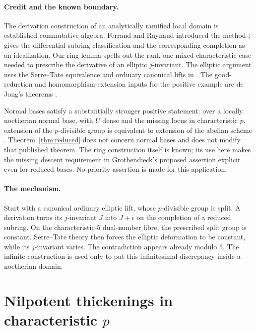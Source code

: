 \documentclass[11pt]{article}
\theoremstyle{remark}\newtheorem{remark}[theorem]{Remark}
\begin{document}
\paragraph{Credit and the known boundary.}
The derivation construction of an analytically ramified local domain is established commutative algebra. Ferrand and Raynaud introduced the method \citep[Lemma~2.1, pp.~300--303]{FerrandRaynaud}; \citet[Theorems~4.1 and~4.4, preprint pp.~11--13]{OlberdingBad} gives the differential-subring classification and the corresponding completion as an idealization. Our ring lemma spells out the rank-one mixed-characteristic case needed to prescribe the derivative of an elliptic $j$-invariant. The elliptic argument uses the Serre--Tate equivalence and ordinary canonical lifts in \citet[Theorem~1.2.1, pp.~143--145; Theorem~2.1, pp.~148--152]{Katz}. The good-reduction and homomorphism-extension inputs for the positive example are de Jong's theorems \citep[Theorems~2--3, p.~261]{DeJongICM}.

Normal bases satisfy a substantially stronger positive statement: over a locally noetherian normal base, with $U$ dense and the missing locus in characteristic $p$, extension of the $p$-divisible group is equivalent to extension of the abelian scheme \citep[Corollary~6.12]{KrishnamoorthyPal}. Theorem~\ref{thm:reduced} does not concern normal bases and does not modify that published theorem. The ring construction itself is known; its use here makes the missing descent requirement in Grothendieck's proposed assertion explicit even for reduced bases. No priority assertion is made for this application.

\paragraph{The mechanism.}
Start with a canonical ordinary elliptic lift, whose $p$-divisible group is split. A derivation turns its $j$-invariant $J$ into $J+\epsilon$ on the completion of a reduced subring. On the characteristic-$5$ dual-number fibre, the prescribed split group is constant. Serre--Tate theory then forces the elliptic deformation to be constant, while its $j$-invariant varies. The contradiction appears already modulo $5$. The infinite construction is used only to put this infinitesimal discrepancy inside a noetherian domain.

\section{Nilpotent thickenings in characteristic \texorpdfstring{$p$}{p}}
\end{document}
